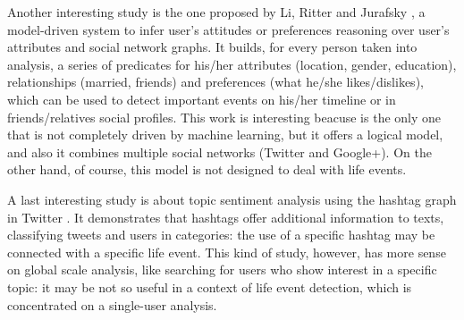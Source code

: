 Another interesting study is the one proposed by Li, Ritter and Jurafsky \cite{li2014inferring}, a model-driven system to infer user's attitudes or preferences reasoning over user's attributes and social network graphs. It builds, for every person taken into analysis, a series of predicates for his/her attributes (location, gender, education), relationships (married, friends) and preferences (what he/she likes/dislikes), which can be used to detect important events on his/her timeline or in friends/relatives social profiles. This work is interesting beacuse is the only one that is not completely driven by machine learning, but it offers a logical model, and also it combines multiple social networks (Twitter and Google+). On the other hand, of course, this model is not designed to deal with life events.

A last interesting study is about topic sentiment analysis using the hashtag graph in Twitter \cite{wang2011topic}. It demonstrates that hashtags offer additional information to texts, classifying tweets and users in categories: the use of a specific hashtag may be connected with a specific life event. This kind of study, however, has more sense on global scale analysis, like searching for users who show interest in a specific topic: it may be not so useful in a context of life event detection, which is concentrated on a single-user analysis.

